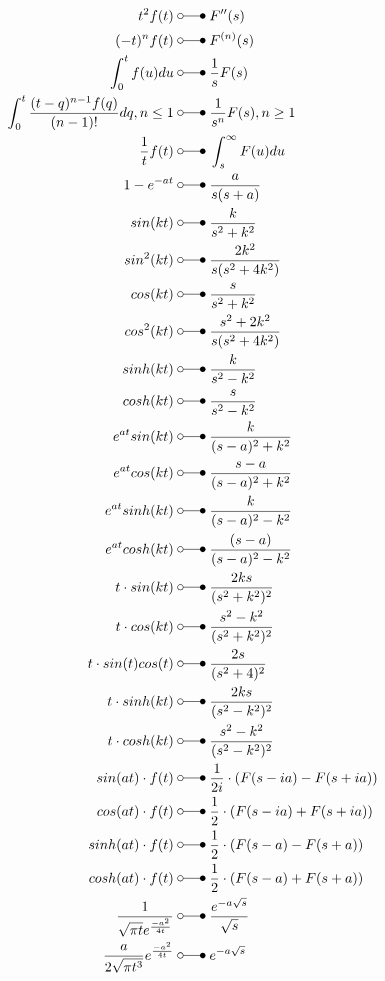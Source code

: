 \begin{align*}
    t^{2}f(t)                       \;&\laplace\; F^{\prime\prime}(s)  \\
    (-t)^n f(t)                     \;&\laplace\; F^{(n)}(s)  \\
    \int_{0}^{t}f(u)du              \;&\laplace\; \frac{1}{s}F(s)  \\
    \int_{0}^{t}\frac{(t-q)^{n-1}f(q)}{(n-1)!}dq,n \leq 1 \;&\laplace\; \frac{1}{s^n}F(s),n \geq 1  \\
    \frac{1}{t}f(t)                 \;&\laplace\; \int_{s}^{\infty}F(u)du  \\
    1-e^{-at}                       \;&\laplace\; \frac{a}{s(s+a)}  \\
    sin(kt)                         \;&\laplace\; \frac{k}{s^2+k^2}  \\
    sin^{2}(kt)                     \;&\laplace\; \frac{2k^2}{s(s^2+4k^2)}  \\
    cos(kt)                         \;&\laplace\; \frac{s}{s^2+k^2}  \\
    cos^{2}(kt)                     \;&\laplace\; \frac{s^2+2k^2}{s(s^2+4k^2)}  \\
    sinh(kt)                        \;&\laplace\; \frac{k}{s^2-k^2} \\
    cosh(kt)                        \;&\laplace\; \frac{s}{s^2-k^2} \\
    e^{at}sin(kt)                   \;&\laplace\; \frac{k}{(s-a)^2+k^2}  \\
    e^{at}cos(kt)                   \;&\laplace\; \frac{s-a}{(s-a)^2+k^2}  \\
    e^{at}sinh(kt)                  \;&\laplace\; \frac{k}{(s-a)^2-k^2}  \\
    e^{at}cosh(kt)                  \;&\laplace\; \frac{(s-a)}{(s-a)^2-k^2}  \\
    t\cdot sin(kt)                        \;&\laplace\; \frac{2ks}{(s^2+k^2)^2}  \\
    t\cdot cos(kt)                        \;&\laplace\; \frac{s^2-k^2}{(s^2+k^2)^2}  \\
    t\cdot sin(t)cos(t)                   \;&\laplace\; \frac{2s}{(s^2+4)^2}  \\
    t\cdot sinh(kt)                       \;&\laplace\; \frac{2ks}{(s^2-k^2)^2}  \\
    t\cdot cosh(kt)                       \;&\laplace\; \frac{s^2-k^2}{(s^2-k^2)^2}  \\
    sin(at)\cdot f(t)               \;&\laplace\; \frac{1}{2i}\cdot(F(s-ia)-F(s+ia)) \\
    cos(at)\cdot f(t)               \;&\laplace\; \frac{1}{2}\cdot(F(s-ia)+F(s+ia)) \\
    sinh(at)\cdot f(t)              \;&\laplace\; \frac{1}{2}\cdot(F(s-a)-F(s+a)) \\
    cosh(at)\cdot f(t)              \;&\laplace\; \frac{1}{2}\cdot(F(s-a)+F(s+a)) \\
    \frac{1}{\sqrt{\pi t}e^{\frac{-a^2}{4t}}} \;&\laplace\; \frac{e^{-a\sqrt{s}}}{\sqrt{s}} \\
    \frac{a}{2\sqrt{\pi t^3}}e^{\frac{-a^2}{4t}} \;&\laplace\; e^{-a\sqrt{s}}
\end{align*}
